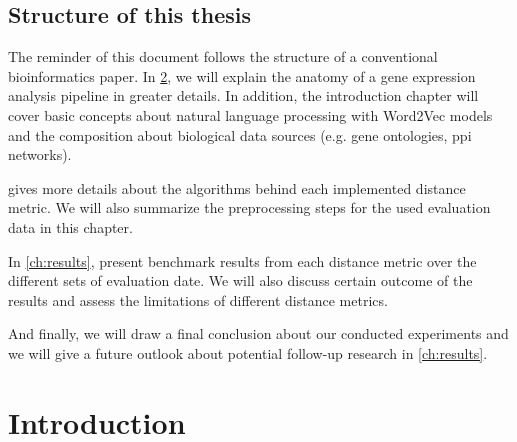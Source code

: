 \documentclass{thesisclass}
\begin{document}
\section{Structure of this thesis}

The reminder of this document follows the structure of a conventional bioinformatics paper. In \cref{ch:introduction}, we will explain the anatomy of a gene expression analysis pipeline in greater details. In addition, the introduction chapter will cover basic concepts about natural language processing with Word2Vec models and the composition about biological data sources (e.g. gene ontologies, \acrshort{ppi} networks).

 gives more details about the algorithms behind each implemented distance metric. We will also summarize the preprocessing steps for the used evaluation data in this chapter.

In \cref{ch:results}, present benchmark results from each distance metric over the different sets of evaluation date. We will also discuss certain outcome of the results and assess the limitations of different distance metrics. 

And finally, we will draw a final conclusion about our conducted experiments and we will give a future outlook about potential follow-up research in \cref{ch:results}.

\chapter{Introduction}  \label{ch:introduction}
\end{document}
